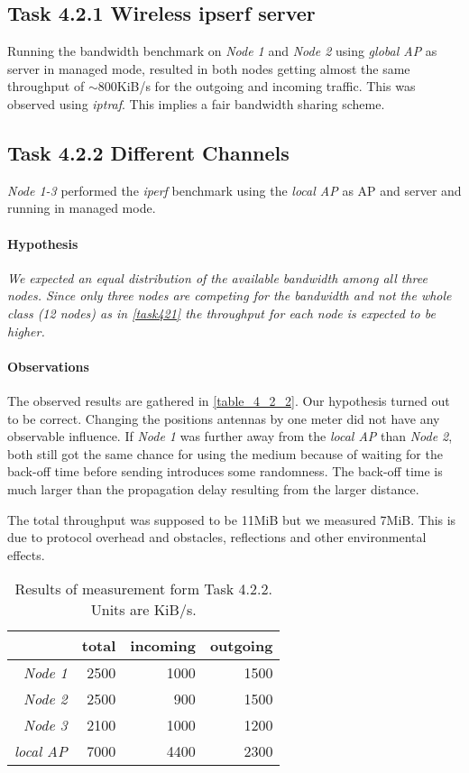 \documentclass[12pt,a4paper]{article}
\begin{document}
\subsection{Task 4.2.1 Wireless ipserf server}\label{task421}
Running the bandwidth benchmark on \emph{Node 1} and \emph{Node 2 }using \emph{global AP} as server in managed mode, resulted in both nodes getting almost the same throughput of $\sim800$KiB/s for the outgoing and incoming traffic. This was observed using \emph{iptraf}.
This implies a fair bandwidth sharing scheme.

\subsection{Task 4.2.2 Different Channels}\label{task422}
\emph{Node 1-3} performed the \emph{iperf} benchmark using the \emph{local AP} as AP and server and running in managed mode.
\paragraph{Hypothesis}
\textit{We expected an equal distribution of the available bandwidth among all three nodes. Since only three nodes are competing for the bandwidth and not the whole class (12 nodes) as in \autoref{task421} the throughput for each node is expected to be higher.}

\paragraph{Observations}
The observed results are gathered in \autoref{table_4_2_2}.
Our hypothesis turned out to be correct.
Changing the positions antennas by one meter did not have any observable influence. If \emph{Node 1} was further away from the \emph{local AP} than \emph{Node 2}, both still got the same chance for using the medium because of waiting for the back-off time before sending introduces some randomness. The back-off time is much larger than the propagation delay resulting from the larger distance.

The total throughput was supposed to be 11MiB but we measured 7MiB. This is due to protocol overhead and obstacles, reflections and other environmental effects.
	\begin{table}
	\begin{center}
		\begin{tabular}{r|r|r|r}\
		 & total & incoming & outgoing \\
		 \hline 
		 \emph{Node 1} & 2500 & 1000 & 1500 \\
		 \emph{Node 2} & 2500 & 900 & 1500 \\
		 \emph{Node 3} & 2100 & 1000 & 1200 \\
		 \emph{local AP} & 7000 & 4400& 2300\\
		\end{tabular}
		
		\caption{Results of measurement form Task 4.2.2. Units are KiB/s.}
		\label{table_4_2_2}
	\end{center}
	\end{table}
\end{document}
